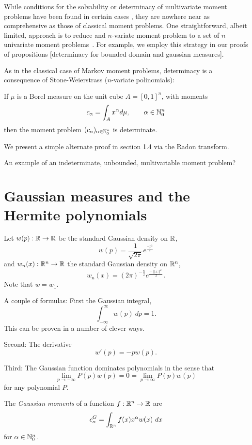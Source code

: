 While conditions for the solvability or determinacy of multivariate moment problems have been found in certain cases \cn, they are nowhere near as comprehensive as those of classical moment problems. One straightforward, albeit limited, approach is to reduce and $n$-variate moment problem to a set of $n$ univariate moment problems~\cite{Pete82}. For example, we employ this strategy in our proofs of propositions [determinacy for bounded domain and gaussian measures].

As in the classical case of Markov moment problems, determinacy is a consequence of Stone-Weierstrass ($n$-variate polinomials):
\begin{proposition}
  If $\mu$ is a Borel measure on the unit cube $A = {[0,1]}^n$, with moments
  \[
    c_\alpha = \int_{A} x^\alpha d\mu, \qquad \alpha \in \mathbb{N}_0^n
  \]
  then the moment problem $(c_\alpha)_{\alpha \in \mathbb{N}_0^n}$ is determinate.
\end{proposition}
We present a simple alternate proof in section 1.4 via the Radon transform.

\begin{myexample}
  An example of an indeterminate, unbounded, multivariable moment problem?
\end{myexample}

\section{Gaussian measures and the Hermite polynomials}
\begin{definition}
  Let $w(p) : \mathbb{R} \rightarrow \mathbb{R}$  be the standard Gaussian density on $\mathbb{R}$,
  \[
    w(p) = \frac1{\sqrt{2\pi}} e^{\frac{-p^2}2}
  \]
  and $w_n(x) : \mathbb{R}^n \rightarrow \mathbb{R}$ the standard Gaussian density on $\mathbb{R}^n$,
  \[
    w_n(x) = {(2\pi)}^{-\frac n2} e^{\frac{-\|x\|^2}2}.
  \]
  Note that $w = w_1$.
\end{definition}

A couple of formulas: First the Gaussian integral,
\[
  \int_{-\infty}^\infty w(p) ~dp = 1.
\]
This can be proven in a number of clever ways.

Second: The derivative
\[
  w'(p) = -pw(p).
\]

Third: The Gaussian function dominates polynomials in the sense that
\[
  \lim_{p \rightarrow -\infty} P(p)w(p) = 0 = \lim_{p \rightarrow \infty} P(p)w(p)
\]
for any polynomial $P$.

\begin{definition}
  The \textit{Gaussian moments} of a function $f: \mathbb{R}^n \rightarrow \mathbb{R}$ are
  \[
    c^G_\alpha = \int_{\mathbb{R}^n} f(x)x^\alpha w(x) ~dx
  \]
  for $\alpha \in \mathbb{N}_0^n$.
\end{definition}

